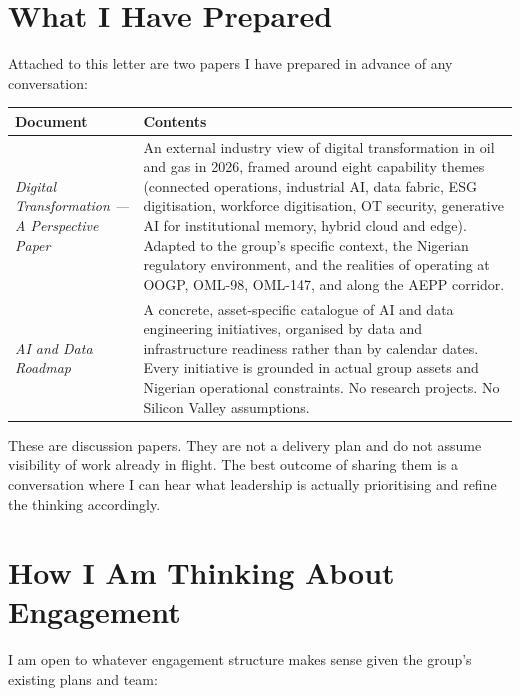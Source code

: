 \documentclass[10pt]{article}
\newcommand{\spacer}{\vspace{10pt}}
\newcommand{\bigspacer}{\vspace{16pt}}
\begin{document}
\section{What I Have Prepared}

Attached to this letter are two papers I have prepared in advance of any
conversation:

\spacer
\small
\begin{tabularx}{\columnwidth}{@{}lX@{}}
\toprule
\textbf{Document} & \textbf{Contents} \\
\midrule
\textit{Digital Transformation --- A Perspective Paper}
  & An external industry view of digital transformation in oil and gas in
    2026, framed around eight capability themes (connected operations,
    industrial AI, data fabric, ESG digitisation, workforce digitisation,
    OT security, generative AI for institutional memory, hybrid cloud and
    edge). Adapted to the group's specific context, the Nigerian regulatory
    environment, and the realities of operating at OOGP, OML-98, OML-147,
    and along the AEPP corridor. \\
\textit{AI and Data Roadmap}
  & A concrete, asset-specific catalogue of AI and data engineering
    initiatives, organised by data and infrastructure readiness rather than
    by calendar dates. Every initiative is grounded in actual group assets
    and Nigerian operational constraints. No research projects.
    No Silicon Valley assumptions. \\
\bottomrule
\end{tabularx}
\normalsize

\spacer
These are discussion papers. They are not a delivery plan and do not assume
visibility of work already in flight. The best outcome of sharing them is
a conversation where I can hear what leadership is actually prioritising
and refine the thinking accordingly.

\bigspacer

\section{How I Am Thinking About Engagement}

I am open to whatever engagement structure makes sense given the group's
existing plans and team:
\end{document}

